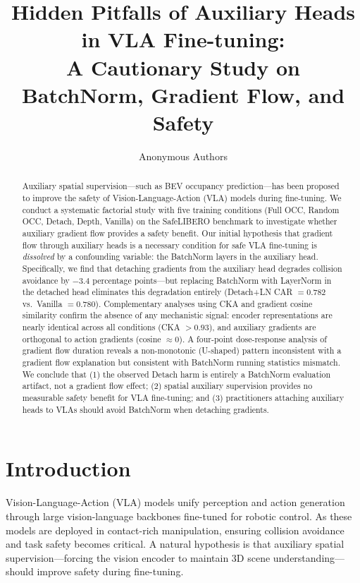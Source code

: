 \documentclass[10pt,letterpaper]{article}
\title{Hidden Pitfalls of Auxiliary Heads in VLA Fine-tuning:\\A Cautionary Study on BatchNorm, Gradient Flow, and Safety}
\author{Anonymous Authors}
\date{}
\begin{document}
\maketitle

\begin{abstract}
Auxiliary spatial supervision---such as BEV occupancy prediction---has been proposed to improve the safety of Vision-Language-Action (VLA) models during fine-tuning.
We conduct a systematic factorial study with five training conditions (Full OCC, Random OCC, Detach, Depth, Vanilla) on the SafeLIBERO benchmark to investigate whether auxiliary gradient flow provides a safety benefit.
Our initial hypothesis that gradient flow through auxiliary heads is a necessary condition for safe VLA fine-tuning is \emph{dissolved} by a confounding variable: the BatchNorm layers in the auxiliary head.
Specifically, we find that detaching gradients from the auxiliary head degrades collision avoidance by $-3.4$ percentage points---but replacing BatchNorm with LayerNorm in the detached head eliminates this degradation entirely (Detach+LN CAR $= 0.782$ vs.\ Vanilla $= 0.780$).
Complementary analyses using CKA and gradient cosine similarity confirm the absence of any mechanistic signal: encoder representations are nearly identical across all conditions (CKA $> 0.93$), and auxiliary gradients are orthogonal to action gradients (cosine $\approx 0$).
A four-point dose-response analysis of gradient flow duration reveals a non-monotonic (U-shaped) pattern inconsistent with a gradient flow explanation but consistent with BatchNorm running statistics mismatch.
We conclude that (1) the observed Detach harm is entirely a BatchNorm evaluation artifact, not a gradient flow effect; (2) spatial auxiliary supervision provides no measurable safety benefit for VLA fine-tuning; and (3) practitioners attaching auxiliary heads to VLAs should avoid BatchNorm when detaching gradients.
\end{abstract}

\section{Introduction}

Vision-Language-Action (VLA) models unify perception and action generation through large vision-language backbones fine-tuned for robotic control. As these models are deployed in contact-rich manipulation, ensuring collision avoidance and task safety becomes critical. A natural hypothesis is that auxiliary spatial supervision---forcing the vision encoder to maintain 3D scene understanding---should improve safety during fine-tuning.
\end{document}
